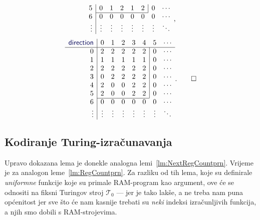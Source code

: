 \begin{primjer}
\begin{equation}
\begin{array}{r|ccccccc}
5& 0 & 1 & 2 & 1 & 2 & \multicolumn{1}{|c}{0} & \cdots\\ \cline{2-6}
6& 0 & 0 & 0 & 0 & 0 & 0 & \cdots\\
\vdots&\vdots&\vdots&\vdots&\vdots&\vdots&\vdots&\ddots
\end{array}\text,
\end{equation}
\begin{equation}
\label{eq:directiontable}
\begin{array}{r|ccccccc}
\f{direction}&0&1&2&3&4&5&\cdots\\\hline
0& 2 & 2 & 2 & 2 & 2 & \multicolumn{1}{|c}{0} & \cdots\\
1& 1 & 1 & 1 & 1 & 1 & \multicolumn{1}{|c}{0} & \cdots\\
2& 2 & 2 & 2 & 2 & 2 & \multicolumn{1}{|c}{0} & \cdots\\
3& 0 & 2 & 2 & 2 & 2 & \multicolumn{1}{|c}{0} & \cdots\\
4& 2 & 0 & 0 & 2 & 2 & \multicolumn{1}{|c}{0} & \cdots\\
5& 2 & 0 & 0 & 2 & 2 & \multicolumn{1}{|c}{0} & \cdots\\ \cline{2-6}
6& 0 & 0 & 0 & 0 & 0 & 0 & \cdots\\
\vdots&\vdots&\vdots&\vdots&\vdots&\vdots&\vdots&\ddots
\end{array}\text.\qedhere
\end{equation}
\end{primjer}

\subsection{Kodiranje Turing-izračunavanja}

Upravo dokazana lema je donekle analogna lemi~\ref{lm:NextRegCountprn}. Vrijeme je za analogon leme~\ref{lm:RegCountprn}. Za razliku od tih lema, koje su definirale \emph{uniformne} funkcije koje su primale RAM-program kao argument, ove će se odnositi na fiksni Turingov stroj $\mathcal T_0$ --- jer je tako lakše, a ne treba nam puna općenitost jer sve što će nam kasnije trebati su \emph{neki} indeksi izračunljivih funkcija, a njih smo dobili s RAM-strojevima.

